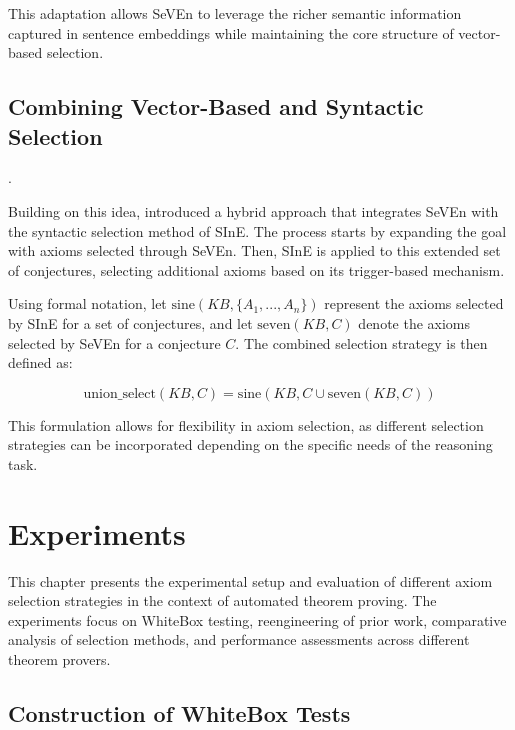 \documentclass[english,version-2020-11]{uzl-thesis}
\begin{document}
This adaptation allows SeVEn to leverage the richer semantic information captured in sentence embeddings while maintaining the core structure of vector-based selection.

\section{Combining Vector-Based and Syntactic Selection}.

Building on this idea, \cite{Schon2023} introduced a hybrid approach that integrates SeVEn with the syntactic selection method of SInE. The process starts by expanding the goal with axioms selected through SeVEn. Then, SInE is applied to this extended set of conjectures, selecting additional axioms based on its trigger-based mechanism. 

Using formal notation, let \( \text{sine}(KB, \{A_1, ..., A_n\}) \) represent the axioms selected by SInE for a set of conjectures, and let \( \text{seven}(KB, C) \) denote the axioms selected by SeVEn for a conjecture \( C \). The combined selection strategy is then defined as:

\begin{definition}
    \begin{equation}
        \text{union\_select}(KB, C) = \text{sine}(KB, C \cup \text{seven}(KB, C))
    \end{equation}
\end{definition}

This formulation allows for flexibility in axiom selection, as different selection strategies can be incorporated depending on the specific needs of the reasoning task.


\chapter{Experiments}
\label{chapter-experiments}

This chapter presents the experimental setup and evaluation of different axiom selection strategies in the context of automated theorem proving. The experiments focus on WhiteBox testing, reengineering of prior work, comparative analysis of selection methods, and performance assessments across different theorem provers.

\section{Construction of WhiteBox Tests}
\end{document}
